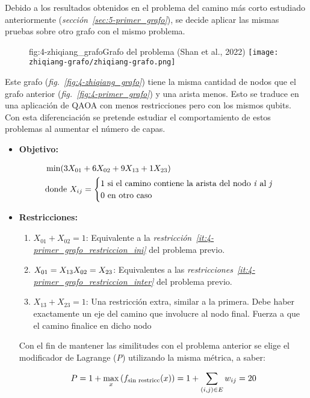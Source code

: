 Debido a los resultados obtenidos en el problema del camino más corto estudiado anteriormente (\textit{sección~\ref{sec:5-primer_grafo}}), se decide aplicar las mismas pruebas sobre otro grafo con el mismo problema.

\begin{figure}[Grafo para estudio de capas {--} camino más corto]{fig:4-zhiqiang_grafo}{Grafo del problema (Shan et al., 2022\cite{solving_shortest_path_with_qaoa})}
  \centering
  \texttt{[image: zhiqiang-grafo/zhiqiang-grafo.png]}
\end{figure}

Este grafo (\textit{fig.~\ref{fig:4-zhiqiang_grafo}}) tiene la misma cantidad de nodos que el grafo anterior (\textit{fig.~\ref{fig:4-primer_grafo}}) y una arista menos.
Esto se traduce en una aplicación de QAOA con menos restricciones pero con los mismos qubits.
\\
Con esta diferenciación se pretende estudiar el comportamiento de estos problemas al aumentar el número de capas.

\begin{itemize}
\item \textbf{Objetivo:}

  \begin{align}
    &\min(3X_{01} + 6X_{02} + 9X_{13} + 1X_{23}) \\
    &\textnormal{donde } X_{ij} = \begin{cases} \nonumber
      1 \textnormal{ si el camino contiene la arista del nodo \textit{i} al \textit{j}} \\
      0 \textnormal{ en otro caso}
    \end{cases}
  \end{align}

\item \textbf{Restricciones:}

  \begin{enumerate}
  \item $X_{01} + X_{02} = 1$: Equivalente a la \textit{restricción~\ref{it:4-primer_grafo_restriccion_ini}} del problema previo.

  \item $X_{01} = X_{13} \\
    X_{02} = X_{23}$: Equivalentes a las \textit{restricciones~\ref{it:4-primer_grafo_restriccion_inter}} del problema previo.

  \item $X_{13} + X_{23} = 1$:  Una restricción extra, similar a la primera.
    Debe haber exactamente un eje del camino que involucre al nodo final.
    Fuerza a que el camino finalice en dicho nodo

  \end{enumerate}

  Con el fin de mantener las similitudes con el problema anterior se elige el modificador de Lagrange (\textit{P}) utilizando la misma métrica, a saber:

  \begin{align}
    P = 1 + \max_{x}{(f_{\textnormal{sin restricc}}(x))} = 1 + \sum_{(i, j)\in{E}}{w_{ij}} = 20
  \end{align}

\end{itemize}

